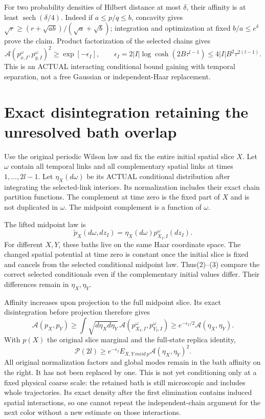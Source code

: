 \documentclass{article}
\begin{document}
For two probability densities of Hilbert distance at most $\delta$, their affinity is at least $\operatorname{sech}(\delta/4)$. Indeed if $a\le p/q\le b$, concavity gives $\sqrt r\ge(r+\sqrt{ab})/(\sqrt a+\sqrt b)$; integration and optimization at fixed $b/a\le e^\delta$ prove the claim. Product factorization of the selected chains gives
\[
 \mathcal A(p_{x,I}^{\omega},p_{y,I}^{\omega})^2
 \ge \exp[-\epsilon_I],\qquad
 \epsilon_I=2|I|\log\cosh(2B\tau^{l-1})
 \le4|I|B^2\tau^{2(l-1)}.                            \tag{3}
\]
This is an ACTUAL interacting conditional bound gaining with temporal separation, not a free Gaussian or independent-Haar replacement.

\section*{Exact disintegration retaining the unresolved bath overlap}
Use the original periodic Wilson law and fix the entire initial spatial slice $X$. Let $\omega$ contain all temporal links and all complementary spatial links at times $1,\ldots,2l-1$. Let $\eta_X(d\omega)$ be its ACTUAL conditional distribution after integrating the selected-link interiors. Its normalization includes their exact chain partition functions. The complement at time zero is the fixed part of $X$ and is not duplicated in $\omega$. The midpoint complement is a function of $\omega$.

The lifted midpoint law is
\[
 \widetilde p_X(d\omega,dz_I)=\eta_X(d\omega)p_{X_I,I}^\omega(dz_I).
\]
For different $X,Y$, these baths live on the same Haar coordinate space. The changed spatial potential at time zero is constant once the initial slice is fixed and cancels from the selected conditional midpoint law. Thus(2)--(3) compare the correct selected conditionals even if the complementary initial values differ. Their differences remain in $\eta_X,\eta_Y$.

Affinity increases upon projection to the full midpoint slice. Its exact disintegration before projection therefore gives
\[
 \mathcal A(p_X,p_Y)
 \ge\int\sqrt{d\eta_X d\eta_Y}\,
       \mathcal A(p_{X_I,I}^\omega,p_{Y_I,I}^\omega)
 \ge e^{-\epsilon_I/2}\mathcal A(\eta_X,\eta_Y).       \tag{4}
\]
With $p(X)$ the original slice marginal and the full-state replica identity,
\[
 \mathcal P(2l)\ge e^{-\epsilon_I}
 E_{X,Y\ {
m iid}\ p}\mathcal A(\eta_X,\eta_Y)^2.    \tag{5}
\]
All original normalization factors and global modes remain in the bath affinity on the right. It has not been replaced by one. This is not yet conditioning only at a fixed physical coarse scale: the retained bath is still microscopic and includes whole trajectories. Its exact density after the first elimination contains induced spatial interactions, so one cannot repeat the independent-chain argument for the next color without a new estimate on those interactions.
\end{document}
